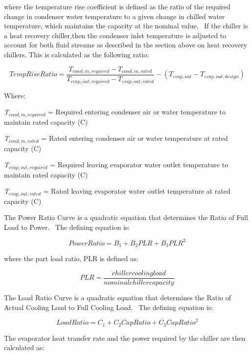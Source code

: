 where the temperature rise coefficient is defined as the ratio of the required change in condenser water temperature to a given change in chilled water temperature, which maintains the capacity at the nominal value.~ If the chiller is a heat recovery chiller,then the condenser inlet temperature is adjusted to account for both fluid streams as described in the section above on heat recovery chillers. This is calculated as the following ratio:

\begin{equation}
TempRiseRatio = \frac{{{T_{cond, in,required}} - {T_{cond,in,rated}}}}{{{T_{evap, out,required}} - {T_{evap,out,rated}}}} - \left( {{T_{evap,out}} - {T_{evap,out,design}}} \right)
\end{equation}

Where:

\emph{T\(_{cond,in,required}\)} = Required entering condenser air or water temperature to maintain rated capacity (C)

\emph{T\(_{cond,in,rated}\)} = Rated entering condenser air or water temperature at rated capacity (C)

\emph{T\(_{evap,out,required}\)} = Required leaving evaporator water outlet temperature to maintain rated capacity (C)

\emph{T\(_{evap,out,rated}\)} = Rated leaving evaporator water outlet temperature at rated capacity (C)

The Power Ratio Curve is a quadratic equation that determines the Ratio of Full Load to Power.~ The defining equation is:

\begin{equation}
PowerRatio = {B_1} + {B_2}PLR + {B_3}PL{R^2}
\end{equation}

where the part load ratio, PLR is defined as:

\begin{equation}
PLR = \frac{{chiller cooling load}}{{nominal chiller capacity}}
\end{equation}

The Load Ratio Curve is a quadratic equation that determines the Ratio of Actual Cooling Load to Full Cooling Load.~ The defining equation is:

\begin{equation}
LoadRatio = {C_1} + {C_2}CapRatio + {C_3}CapRati{o^2}
\end{equation}

The evaporator heat transfer rate and the power required by the chiller are then calculated as:

